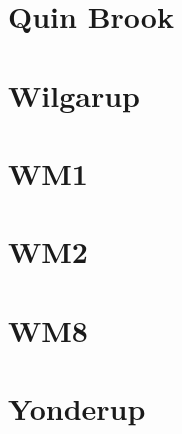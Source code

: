 \documentclass[]{article}
\begin{document}
\hypertarget{quin-brook}{%
\section{Quin Brook}\label{quin-brook}}

\hypertarget{wilgarup}{%
\section{Wilgarup}\label{wilgarup}}

\hypertarget{wm1}{%
\section{WM1}\label{wm1}}

\hypertarget{wm2}{%
\section{WM2}\label{wm2}}

\hypertarget{wm8}{%
\section{WM8}\label{wm8}}

\hypertarget{yonderup}{%
\section{Yonderup}\label{yonderup}}
\end{document}
